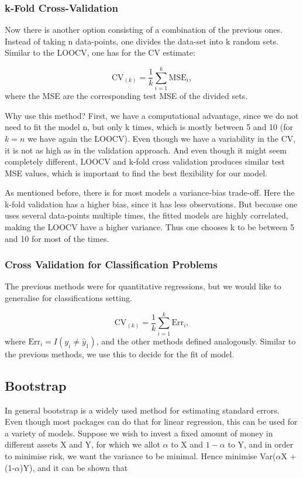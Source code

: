 \documentclass{article}
\begin{document}
\subsubsection{k-Fold Cross-Validation}

Now there is another option consisting of a combination of the previous ones. Instead of taking n data-points, one divides the data-set into k random sets. Similar to the LOOCV, one has for the CV estimate:

\[
\text{CV}_{(k)} = \frac{1}{k} \sum_{i=1}^k \text{MSE}_i,
\]
where the MSE are the corresponding test MSE of the divided sets. 

Why use this method? 
First, we have a computational advantage, since we do not need to fit the model n, but only k times, which is mostly between 5 and 10 (for $k=n$ we have again the LOOCV). Even though we have a variability in the CV, it is not as high as in the validation approach. And even though it might seem completely different, LOOCV and k-fold cross validation produces similar test MSE values, which is important to find the best flexibility for our model. \par

As mentioned before, there is for most models a variance-bias trade-off. 
Here the k-fold validation has a higher bias, since it has less observations. But because one uses several data-points multiple times, the fitted models are highly correlated, making the LOOCV have a higher variance. Thus one chooses k to be between 5 and 10 for most of the times. 

\subsubsection{Cross Validation for Classification Problems}
The previous methods were for quantitative regressions, but we would like to generalise for classifications setting. 


\[
\text{CV}_{(k)} = \frac{1}{k} \sum_{i=1}^k \text{Err}_i,
\]
where $ \text{Err}_i=I(y_i\neq \hat{y}_1)$, and the other methods defined analogously. Similar to the previous methods, we use this to decide for the fit of model. 


\subsection{Bootstrap}

In general bootstrap is a widely used method for estimating standard errors. Even though most packages can do that for linear regression, this can be used for a variety of models. 
Suppose we wish to invest a fixed amount of money in different assets X and Y, for which we allot $\alpha$ to X and $1-\alpha$ to Y, and in order to minimise risk, we want the variance to be minimal. 
Hence minimise Var($\alpha$X + (1-$\alpha$)Y), and it can be shown that
\end{document}
